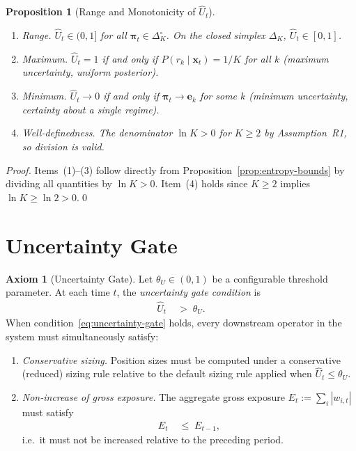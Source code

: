 \documentclass[12pt,openany]{book}
\newcommand{\bfpi}{\boldsymbol{\pi}}
\newcommand{\bfx}{\mathbf{x}}
\numberwithin{equation}{chapter}
\theoremstyle{plain}
\newtheorem{proposition}[theorem]{Proposition}
\theoremstyle{definition}
\newtheorem{axiom}[theorem]{Axiom}
\theoremstyle{remark}
\numberwithin{equation}{chapter}
\theoremstyle{plain}
\newcommand{\bfe}{\mathbf{e}}
\begin{document}
\begin{proposition}[Range and Monotonicity of $\hat{U}_t$]
\label{prop:Uhat-range}
\begin{enumerate}
  \item \emph{Range.}  $\hat{U}_t \in (0, 1]$ for all
        $\bfpi_t \in \Delta_K^{\circ}$.
        On the closed simplex $\Delta_K$,
        $\hat{U}_t \in [0, 1]$.
  \item \emph{Maximum.}  $\hat{U}_t = 1$ if and only if
        $P(r_k \mid \bfx_t) = 1/K$ for all $k$ (maximum
        uncertainty, uniform posterior).
  \item \emph{Minimum.}  $\hat{U}_t \to 0$ if and only if
        $\bfpi_t \to \bfe_k$ for some $k$ (minimum
        uncertainty, certainty about a single regime).
  \item \emph{Well-definedness.}  The denominator
        $\ln K > 0$ for $K \geq 2$ by Assumption~R1,
        so division is valid.
\end{enumerate}
\end{proposition}

\begin{proof}
Items~(1)--(3) follow directly from
Proposition~\ref{prop:entropy-bounds} by dividing
all quantities by $\ln K > 0$.  Item~(4) holds
since $K \geq 2$ implies $\ln K \geq \ln 2 > 0$.\qed
\end{proof}

\section{Uncertainty Gate}

\begin{axiom}[Uncertainty Gate]
\label{ax:uncertainty-gate}
Let $\theta_U \in (0, 1)$ be a configurable threshold parameter.
At each time $t$, the \emph{uncertainty gate condition} is
\begin{align}
  \hat{U}_t &\;>\; \theta_U.
  \label{eq:uncertainty-gate}
\end{align}
When condition~\eqref{eq:uncertainty-gate} holds, every
downstream operator in the system must simultaneously satisfy:
\begin{enumerate}
  \item \emph{Conservative sizing.}  Position sizes must be
        computed under a conservative (reduced) sizing rule
        relative to the default sizing rule applied when
        $\hat{U}_t \leq \theta_U$.
  \item \emph{Non-increase of gross exposure.}  The aggregate
        gross exposure $E_t := \sum_{i} |w_{i,t}|$ must
        satisfy
        \begin{align}
          E_t &\;\leq\; E_{t-1},
          \label{eq:exposure-constraint}
        \end{align}
        i.e.\ it must not be increased relative to the
        preceding period.
\end{enumerate}
\end{axiom}
\end{document}

